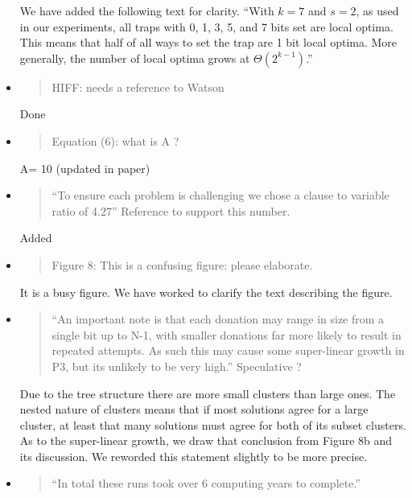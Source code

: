 \documentclass[]{article}
\begin{document}
\begin{itemize}
We have added the following text for clarity. 
``With $k=7$ and $s=2$, as used in our experiments, all traps with 0, 1, 3, 5, and 7 bits set are local optima.
This means that half of all ways to set the trap are 1 bit local optima.
More generally, the number of local optima grows at $\Theta(2^{k-1})$.''

\item
\begin{quote}
HIFF: needs a reference to Watson
\end{quote}

Done

\item
\begin{quote}
Equation (6): what is A ?
\end{quote}

A= 10 (updated in paper)

\item
\begin{quote}
``To ensure each problem is challenging we chose a clause to variable ratio of 4.27''
Reference to support this number.
\end{quote}

Added 

\item
\begin{quote}
Figure 8: This is a confusing figure: please elaborate.
\end{quote}

It is a busy figure. We have worked to clarify the text describing the figure.

\item
\begin{quote}
``An important note is that each donation may range in size from a single bit up to N-1, with smaller donations far more likely to result in repeated attempts. As such this may cause some super-linear growth in P3, but its unlikely to be very high.''
Speculative ?
\end{quote}

Due to the tree structure there are more small clusters than large ones. The nested nature of clusters means that if most solutions agree for a large cluster, at least that many solutions must agree for both of its subset clusters. As to the super-linear growth, we draw that conclusion from Figure 8b and its discussion. We reworded this statement slightly to be more precise.

\item
\begin{quote}
``In total these runs took over 6 computing years to complete.''
\end{quote}


\end{itemize}
\end{document}
